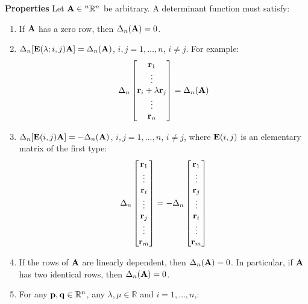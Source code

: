 \documentclass{article}
\begin{document}
\begin{minipage}[t]{0.45\linewidth}
        \textbf{Properties} Let $\mathbf{A} \in {^n}\mathbb{R}^n$ be arbitrary. A determinant function must satisfy:
        \begin{enumerate}
            \item If $\mathbf{A}$ has a zero row, then $\Delta_n(\mathbf{A})=0$.
            \item $\Delta_n[\mathbf{E}(\lambda;i,j)\mathbf{A}] = \Delta_n(\mathbf{A})$, $i,j=1,\dots,n$, $i\neq j$. For example:
            \begin{equation*}
                \Delta_n \begin{bmatrix}
                    \mathbf{r}_1 \\ \vdots \\ \mathbf{r}_i+\lambda \mathbf{r}_j \\ \vdots \\ \mathbf{r}_n
                \end{bmatrix} = \Delta_n(\mathbf{A})
            \end{equation*}
            \item $\Delta_n[\mathbf{E}(i,j)\mathbf{A}]=-\Delta_n(\mathbf{A})$, $i,j=1,\dots, n$, $i\neq j$, where $\mathbf{E}(i,j)$ is an elementary matrix of the first type:
            \begin{equation*}
                \Delta_n \begin{bmatrix}
                    \mathbf{r}_1\\\vdots \\ \mathbf{r}_i \\ \vdots \\ \mathbf{r}_j \\ \vdots \\ \mathbf{r}_m
                \end{bmatrix} = -\Delta_n \begin{bmatrix}
                    \mathbf{r}_1\\\vdots \\ \mathbf{r}_j \\ \vdots \\ \mathbf{r}_i \\ \vdots \\ \mathbf{r}_m
                \end{bmatrix}
            \end{equation*}
            \item If the rows of $\mathbf{A}$ are linearly dependent, then $\Delta_n(\mathbf{A})=0$. In particular, if $\mathbf{A}$ has two identical rows, then $\Delta_n(\mathbf{A})=0$.
            \item For any $\mathbf{p},\mathbf{q} \in \mathbb{R}^n$, any $\lambda,\mu \in \mathbb{R}$ and $i=1,\dots,n$,:

\end{enumerate}
\end{minipage}
\end{document}
